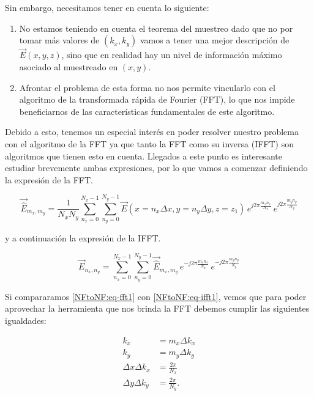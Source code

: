 Sin embargo, necesitamos tener en cuenta lo siguiente:
\begin{enumerate}
    \item No estamos teniendo en cuenta el teorema del muestreo dado que no por
    tomar más valores de $(k_{x},k_{y})$ vamos a tener una mejor descripción
    de $\vec{E}(x,y,z)$, sino que en realidad hay un nivel de información máximo
    asociado al muestreado en $(x,y)$.
    
    \item Afrontar el problema de esta forma no nos permite vincularlo con el algoritmo de la transformada rápida de Fourier (FFT), lo que nos impide beneficiarnos de las características fundamentales de este algoritmo.

\end{enumerate}

\noindent
Debido a esto, tenemos un especial interés en poder resolver nuestro problema con el algoritmo de la FFT ya que tanto la FFT como su inversa (IFFT) son algoritmos que tienen esto en cuenta. Llegados a este punto es interesante estudiar brevemente ambas expresiones, por lo que vamos a comenzar definiendo la expresión de la FFT. 

\begin{equation}
\vec{\hat{E}}_{m_{x},m_{y}}=\frac{1}{N_{x} N_{y}}
\sum_{n_{x}=0}^{N_{x}-1}\sum_{n_{y}=0}^{N_{y}-1}
\vec{E}(x=n_{x}\Delta x,y=n_{y} \Delta y,z=z_{1}) \,e^{j 2\pi
\frac{m_{x} n_{x}}{N_{x}}}\,e^{j 2\pi \frac{m_{y} n_{y}}{N_{y}}}
\label{NFtoNF:eq-fft1}
\end{equation}

\noindent
y a continuación la expresión de la IFFT.

\begin{equation}
\vec{E}_{n_{x},n_{y}}=
\sum_{n_{x}=0}^{N_{x}-1}\sum_{n_{y}=0}^{N_{y}-1}
\vec{\hat{E}}_{m_{x},m_{y}} \,e^{-j 2\pi \frac{m_{x}
n_{x}}{N_{x}}}\,e^{-j 2\pi \frac{m_{y} n_{y}}{N_{y}}}
\label{NFtoNF:eq-ifft1}
\end{equation}

Si compararamos  \eqref{NFtoNF:eq-fft1} con \eqref{NFtoNF:eq-ifft1}, vemos que para
poder aprovechar la herramienta que nos brinda la FFT debemos cumplir las siguientes igualdades:

\begin{subequations}
\begin{align}
k_{x}&= m_{x}\Delta k_{x}
\\
k_{y}&= m_{y}\Delta k_{y}
\\
\Delta x \Delta k_{x}&=\frac{2\pi}{N_{x}}
\\
\Delta y \Delta k_{y}&=\frac{2\pi}{N_{y}}.
\end{align}
\end{subequations}

